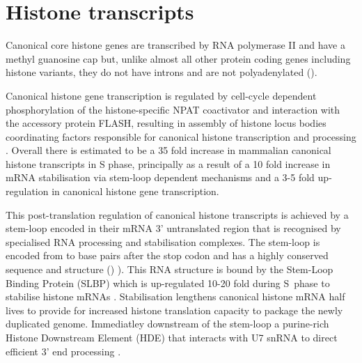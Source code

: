 \section{Histone transcripts}
  
	Canonical core histone genes are transcribed by RNA polymerase II 
	and have a methyl guanosine cap 
	but, unlike almost all other protein coding genes including histone variants, 
	they do not have introns and are not polyadenylated ().

	Canonical histone gene transcription is regulated 
	by cell-cycle dependent phosphorylation of the histone-specific NPAT coactivator 
	and interaction with the accessory protein FLASH, 
	resulting in assembly of histone locus bodies 
	coordinating factors responsible for canonical histone transcription and processing .
	Overall there is estimated to be a 35 fold increase in mammalian canonical histone transcripts in S phase,
	principally as a result of a 10 fold increase in mRNA stabilisation via stem-loop dependent mechanisms 
	and a 3-5 fold up-regulation in canonical histone gene transcription. 

	This post-translation regulation of canonical histone transcripts 
	is achieved by a stem-loop encoded in their mRNA 3' untranslated region 
	that is recognised by specialised RNA processing and stabilisation complexes.
	The stem-loop is encoded from \StemLoopStart{} to \StemLoopEnd{} base pairs after the stop codon 
	and has a highly conserved sequence and structure () \citep{stem-loop-structure}).
	This RNA structure is bound by the Stem-Loop Binding Protein (SLBP) 
	which is up-regulated 10-20 fold during S~phase to stabilise histone mRNAs \citep{SLBP-regulation}. 
	Stabilisation lengthens canonical histone mRNA half lives 
	to provide for increased histone translation capacity to package the newly duplicated genome.
	Immediatley downstream of the stem-loop a purine-rich Histone Downstream Element (HDE) 
	that interacts with U7 snRNA to direct efficient 3' end processing \citep{HDE-sequence}.

